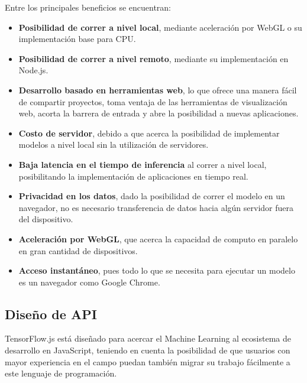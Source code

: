Entre los principales beneficios se encuentran:
\begin{itemize}

    \item  \textbf{Posibilidad de correr a nivel local}, mediante aceleración por WebGL o su implementación base para CPU.
    \item \textbf{Posibilidad de correr a nivel remoto}, mediante su implementación en Node.js.
    \item \textbf{Desarrollo basado en herramientas web}, lo que ofrece una manera fácil de compartir proyectos, toma ventaja de las herramientas de visualización web, acorta la barrera de entrada y abre la posibilidad a nuevas aplicaciones.
    \item  \textbf{Costo de servidor}, debido a que acerca la posibilidad de implementar modelos a nivel local sin la utilización de
    servidores.
    \item \textbf{Baja latencia en el tiempo de inferencia} al correr a nivel local, posibilitando la implementación de aplicaciones
    en tiempo real.
    \item \textbf{Privacidad en los datos}, dado la posibilidad de correr el modelo en un navegador, no es necesario transferencia de
    datos hacia algún servidor fuera del dispositivo.
    \item \textbf{Aceleración por WebGL}, que acerca la capacidad de computo en paralelo en gran cantidad de dispositivos.
    \item \textbf{Acceso instantáneo}, pues todo lo que se necesita para ejecutar un modelo es un navegador como Google Chrome.
\end{itemize}







\subsection{Diseño de API}


TensorFlow.js está diseñado para acercar el Machine Learning al ecosistema de desarrollo en JavaScript, teniendo en cuenta la posibilidad de que usuarios con mayor experiencia en el campo puedan también migrar su trabajo fácilmente a este lenguaje de programación.

